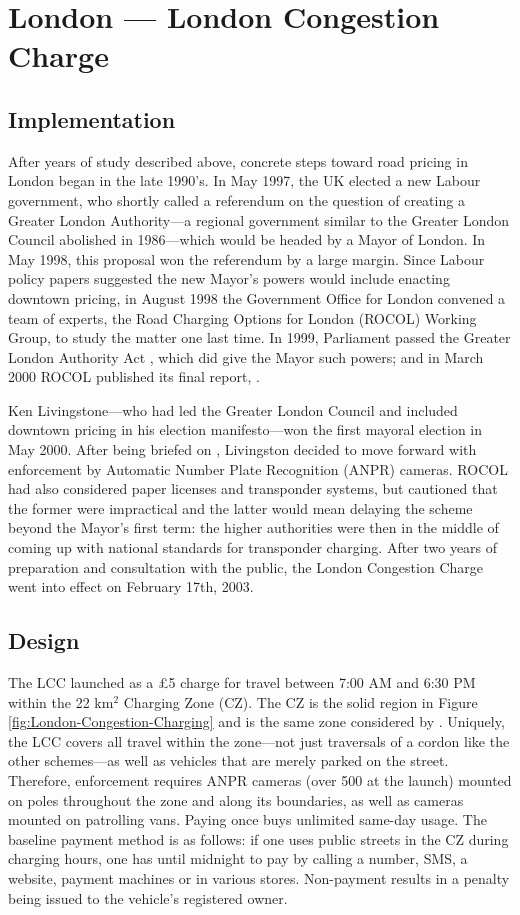 \section{London --- London Congestion Charge}

\subsection{Implementation}

After years of study described above, concrete steps toward road pricing in London began in the late 1990's. In May 1997, the UK elected a new Labour government, who shortly called a referendum on the question of creating a Greater London Authority---a regional government similar to the Greater London Council abolished in 1986---which would be headed by a Mayor of London. In May 1998, this proposal won the referendum by a large margin. Since Labour policy papers suggested the new Mayor's powers would include enacting downtown pricing, in August 1998 the Government Office for London convened a team of experts, the Road Charging Options for London (ROCOL) Working Group, to study the matter one last time. In 1999, Parliament passed the Greater London Authority Act \citep{Parliament1999}, which did give the Mayor such powers; and in March 2000 ROCOL published its final report, \citep{ROCOL2000}.

Ken Livingstone---who had led the Greater London Council and included downtown pricing in his election manifesto---won the first mayoral election in May 2000. After being briefed on \citet{ROCOL2000}, Livingston decided to move forward with enforcement by Automatic Number Plate Recognition (ANPR) cameras. ROCOL had also considered paper licenses and transponder systems, but cautioned that the former were impractical and the latter would mean delaying the scheme beyond the Mayor's first term: the higher authorities were then in the middle of coming up with national standards for transponder charging. After two years of preparation and consultation with the public, the London Congestion Charge went into effect on February 17th, 2003.

\subsection{Design}

The LCC launched as a \pounds5 charge for travel between 7:00 AM and 6:30 PM within the 22 km$^{2}$ Charging Zone (CZ). The CZ is the solid region in Figure \ref{fig:London-Congestion-Charging} and is the same zone considered by \citet{Thomson1967a}. Uniquely, the LCC covers all travel within the zone---not just traversals of a cordon like the other schemes---as well as vehicles that are merely parked on the street. Therefore, enforcement requires ANPR cameras (over 500 at the launch) mounted on poles throughout the zone and along its boundaries, as well as cameras mounted on patrolling vans. Paying once buys unlimited same-day usage. The baseline payment method is as follows: if one uses public streets in the CZ during charging hours, one has until midnight to pay by calling a number, SMS, a website, payment machines or in various stores. Non-payment results in a penalty being issued to the vehicle's registered owner.

